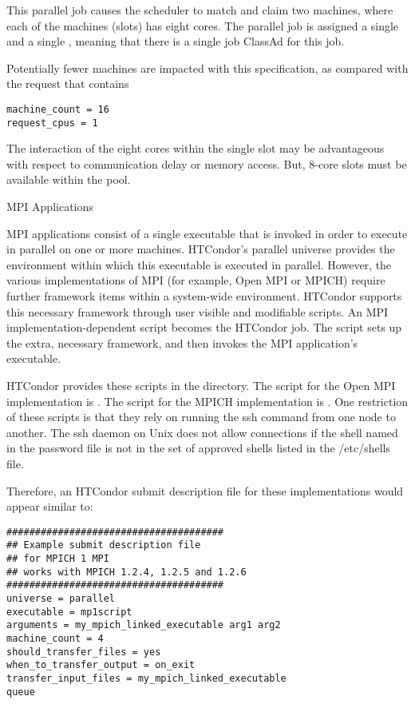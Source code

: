 This parallel job causes the scheduler to match and claim two
machines, where each of the machines (slots) has eight cores.
The parallel job is assigned a single 
and a single , meaning that there is a single job
ClassAd for this job.

Potentially fewer machines are impacted with this specification,
as compared with the request that contains
\footnotesize
\begin{verbatim}
machine_count = 16
request_cpus = 1
\end{verbatim}
\normalsize
The interaction of the eight cores within the single slot may 
be advantageous with respect to communication delay or memory access.
But, 8-core slots must be available within the pool.

\label{sec:parallel-mpi-submit}
\begin{description}
\item[MPI Applications]
\end{description}


MPI applications consist of a single executable that is invoked in order to
execute in parallel on one or more machines. 
HTCondor's parallel universe provides the environment within
which this executable is executed in parallel.
However, the various implementations of MPI
(for example, Open MPI or MPICH) require further framework items within
a system-wide environment.
HTCondor supports this necessary framework through 
user visible and modifiable scripts.
An MPI implementation-dependent script becomes the HTCondor job.
The script sets up the extra, necessary framework,
and then invokes the MPI application's executable.

HTCondor provides these scripts in the
directory.
The script for the Open MPI implementation is .
The script for the MPICH implementation is .
One restriction of these scripts is that they rely on running
the ssh command from one node to another.  The ssh daemon 
on Unix does not allow connections if the shell named in
the password file is not in the set of approved shells
listed in the /etc/shells file.

Therefore, an HTCondor submit description file for these
implementations would appear similar to:

\begin{verbatim}
######################################
## Example submit description file
## for MPICH 1 MPI
## works with MPICH 1.2.4, 1.2.5 and 1.2.6
######################################
universe = parallel
executable = mp1script
arguments = my_mpich_linked_executable arg1 arg2
machine_count = 4
should_transfer_files = yes
when_to_transfer_output = on_exit
transfer_input_files = my_mpich_linked_executable
queue
\end{verbatim}

